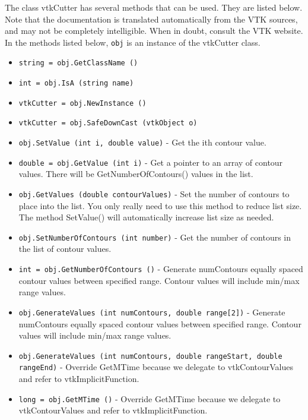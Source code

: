 The class vtkCutter has several methods that can be used.
  They are listed below.
Note that the documentation is translated automatically from the VTK sources,
and may not be completely intelligible.  When in doubt, consult the VTK website.
In the methods listed below, \verb|obj| is an instance of the vtkCutter class.
\begin{itemize}
\item  \verb|string = obj.GetClassName ()|

\item  \verb|int = obj.IsA (string name)|

\item  \verb|vtkCutter = obj.NewInstance ()|

\item  \verb|vtkCutter = obj.SafeDownCast (vtkObject o)|

\item  \verb|obj.SetValue (int i, double value)| -  Get the ith contour value.

\item  \verb|double = obj.GetValue (int i)| -  Get a pointer to an array of contour values. There will be
 GetNumberOfContours() values in the list.

\item  \verb|obj.GetValues (double contourValues)| -  Set the number of contours to place into the list. You only really
 need to use this method to reduce list size. The method SetValue()
 will automatically increase list size as needed.

\item  \verb|obj.SetNumberOfContours (int number)| -  Get the number of contours in the list of contour values.

\item  \verb|int = obj.GetNumberOfContours ()| -  Generate numContours equally spaced contour values between specified
 range. Contour values will include min/max range values.

\item  \verb|obj.GenerateValues (int numContours, double range[2])| -  Generate numContours equally spaced contour values between specified
 range. Contour values will include min/max range values.

\item  \verb|obj.GenerateValues (int numContours, double rangeStart, double rangeEnd)| -  Override GetMTime because we delegate to vtkContourValues and refer to
 vtkImplicitFunction.

\item  \verb|long = obj.GetMTime ()| -  Override GetMTime because we delegate to vtkContourValues and refer to
 vtkImplicitFunction.


\end{itemize}
